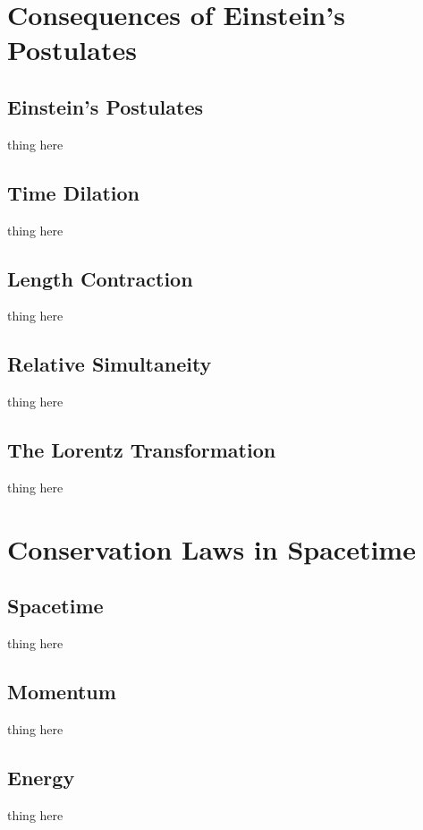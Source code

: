 \documentclass[10pt,a4paper,oneside]{book}
\begin{document}
\tableofcontents

\chapter{Consequences of Einstein's Postulates}
\section{Einstein's Postulates}
thing here

\section{Time Dilation}
thing here

\section{Length Contraction}
thing here

\section{Relative Simultaneity}
thing here

\section{The Lorentz Transformation}
thing here

\chapter{Conservation Laws in Spacetime}
\section{Spacetime}
thing here

\section{Momentum}
thing here

\section{Energy}
thing here
\end{document}
